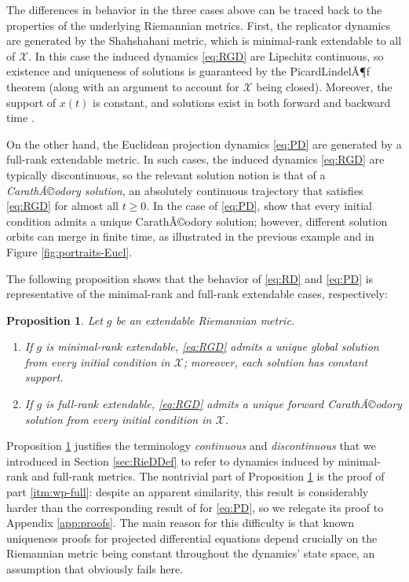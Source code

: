\documentclass[reqno]{amsart}
\theoremstyle{plain}
\newtheorem{proposition}[theorem]{Proposition}
\theoremstyle{definition}
\theoremstyle{remark}
\numberwithin{equation}{section}
\numberwithin{theorem}{section}
\begin{document}
The differences in behavior in the three cases above can be traced back to the properties of the underlying Riemannian metrics.
First, the replicator dynamics are generated by the Shahshahani metric, which is minimal-rank extendable to all of ${\mathcal{X}}$.
In this case the induced dynamics \eqref{eq:RGD} are Lipschitz continuous, so existence and uniqueness of solutions is guaranteed by the Picard\textendash LindelÃ¶f theorem (along with an argument to account for ${\mathcal{X}}$ being closed).
Moreover, the support of $x(t)$ is constant, and solutions exist in both forward and backward time \cite[Theorems 4.A.5 and 5.4.7]{San10}.

On the other hand, the Euclidean projection dynamics \eqref{eq:PD} are generated by a full-rank extendable metric.
In such cases, the induced dynamics \eqref{eq:RGD} are typically discontinuous, so the relevant solution notion is that of a \emph{CarathÃ©odory solution}, an absolutely continuous trajectory that satisfies \eqref{eq:RGD} for almost all $t\geq0$.
In the case of \eqref{eq:PD}, \cite{LS08} show that every initial condition admits a unique CarathÃ©odory solution;
however, different solution orbits can merge in finite time, as illustrated in the previous example and in Figure \ref{fig:portraits-Eucl}.

The following proposition shows that the behavior of \eqref{eq:RD} and \eqref{eq:PD} is representative of the minimal-rank and full-rank extendable cases, respectively:

\begin{proposition}
\label{prop:wp}
Let $g$ be an extendable Riemannian metric.
\begin{enumerate}
\item
\label{itm:wp-min}
If $g$ is minimal-rank extendable, \eqref{eq:RGD} admits a unique global solution from every initial condition in ${\mathcal{X}}$;
moreover, each solution has constant support.

\item
\label{itm:wp-full}
If $g$ is full-rank extendable, \eqref{eq:RGD} admits a unique forward CarathÃ©odory solution from every initial condition in ${\mathcal{X}}$.
\end{enumerate}
\end{proposition}

Proposition \ref{prop:wp} justifies the terminology \emph{continuous} and \emph{discontinuous} that we introduced in Section \ref{sec:RieDDef} to refer to dynamics induced by minimal-rank and full-rank metrics.
The nontrivial part of Proposition \ref{prop:wp} is the proof of part \eqref{itm:wp-full}:
despite an apparent similarity, this result is considerably harder than the corresponding result of \cite{LS08} for \eqref{eq:PD}, so we relegate its proof to Appendix \ref{app:proofs}.
The main reason for this difficulty is that known 
uniqueness proofs for projected differential equations depend crucially on the Riemannian metric being constant throughout the dynamics' state space, an assumption that obviously fails here.
\end{document}
